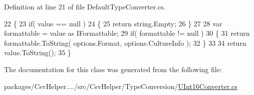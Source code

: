Definition at line 21 of file Default\-Type\-Converter.\-cs.


\begin{DoxyCode}
22         \{
23             \textcolor{keywordflow}{if}( value == null )
24             \{
25                 \textcolor{keywordflow}{return} string.Empty;
26             \}
27 
28             var formattable = value as IFormattable;
29             \textcolor{keywordflow}{if}( formattable != null )
30             \{
31                 \textcolor{keywordflow}{return} formattable.ToString( options.Format, options.CultureInfo );
32             \}
33 
34             \textcolor{keywordflow}{return} value.ToString();
35         \}
\end{DoxyCode}


The documentation for this class was generated from the following file\-:\begin{DoxyCompactItemize}
\item 
packages/\-Csv\-Helper..../src/\-Csv\-Helper/\-Type\-Conversion/\hyperlink{a00274}{U\-Int16\-Converter.\-cs}\end{DoxyCompactItemize}
